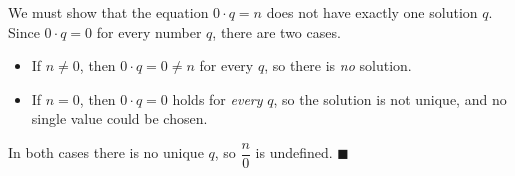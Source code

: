 We must show that the equation $0\cdot q=n$ does not have exactly one solution $q$. Since $0\cdot q=0$ for every number $q$, there are two cases.
\begin{itemize}
\item If $n\ne0$, then $0\cdot q=0\ne n$ for every $q$, so there is \emph{no} solution.
\item If $n=0$, then $0\cdot q=0$ holds for \emph{every} $q$, so the solution is not unique, and no single value could be chosen.
\end{itemize}
In both cases there is no unique $q$, so $\dfrac n0$ is undefined. $\blacksquare$
